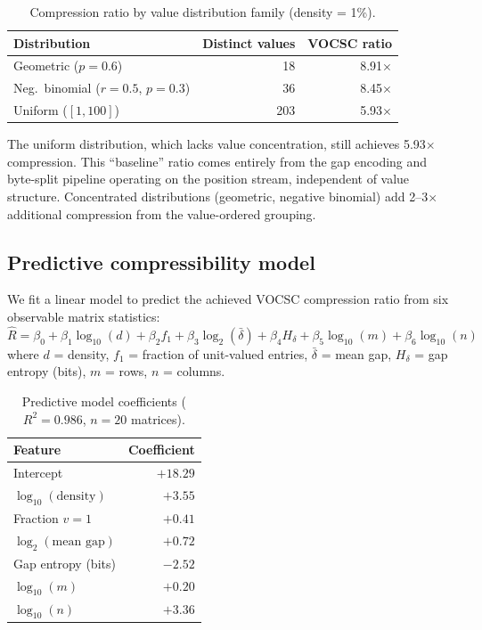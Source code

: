 \documentclass[10pt,twocolumn,letterpaper]{article}
\begin{document}
\begin{table}[t]
\centering
\caption{Compression ratio by value distribution family (density = 1\%).}
\label{tab:dist}
\footnotesize
\begin{tabular}{lrr}
\toprule
Distribution & Distinct values & VOCSC ratio \\
\midrule
Geometric ($p{=}0.6$) & 18 & 8.91$\times$ \\
Neg.\ binomial ($r{=}0.5$, $p{=}0.3$) & 36 & 8.45$\times$ \\
Uniform ($[1, 100]$) & 203 & 5.93$\times$ \\
\bottomrule
\end{tabular}
\end{table}

The uniform distribution, which lacks value concentration, still achieves 5.93$\times$ compression.
This ``baseline'' ratio comes entirely from the gap encoding and byte-split pipeline operating on the position stream, independent of value structure.
Concentrated distributions (geometric, negative binomial) add 2--3$\times$ additional compression from the value-ordered grouping.

\subsection{Predictive compressibility model}
\label{sec:model}

We fit a linear model to predict the achieved VOCSC compression ratio from six observable matrix statistics:
\begin{equation}
\hat{R} = \beta_0 + \beta_1 \log_{10}(d) + \beta_2 f_1 + \beta_3 \log_2(\bar{\delta}) + \beta_4 H_\delta + \beta_5 \log_{10}(m) + \beta_6 \log_{10}(n)
\end{equation}
where $d$ = density, $f_1$ = fraction of unit-valued entries, $\bar{\delta}$ = mean gap, $H_\delta$ = gap entropy (bits), $m$ = rows, $n$ = columns.

\begin{table}[t]
\centering
\caption{Predictive model coefficients ($R^2 = 0.986$, $n = 20$ matrices).}
\label{tab:model}
\footnotesize
\begin{tabular}{lr}
\toprule
Feature & Coefficient \\
\midrule
Intercept                & $+18.29$ \\
$\log_{10}(\text{density})$ & $+3.55$ \\
Fraction $v{=}1$           & $+0.41$ \\
$\log_2(\text{mean gap})$  & $+0.72$ \\
Gap entropy (bits)          & $-2.52$ \\
$\log_{10}(m)$              & $+0.20$ \\
$\log_{10}(n)$              & $+3.36$ \\
\bottomrule
\end{tabular}
\end{table}
\end{document}
